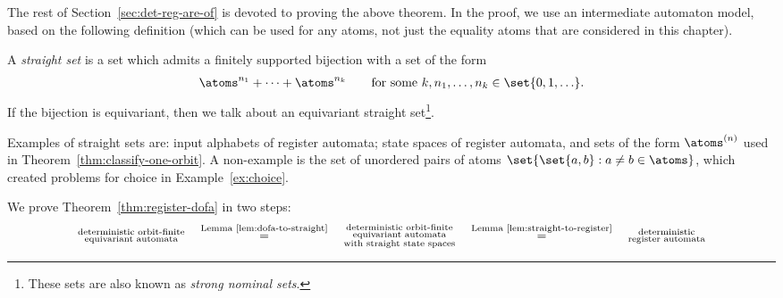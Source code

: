 The rest of Section~\ref{sec:det-reg-are-of} is devoted to proving the above theorem. In the proof, we use an intermediate automaton model, based on the following definition (which can be used for any atoms, not just the equality atoms that are considered in this chapter).

\begin{definition}\label{def:straight-set}
 A \emph{straight set} is a set which admits a finitely supported bijection with a set of the form 
 \begin{align*}
 \atoms^{n_1} + \cdots + \atoms^{n_k} \qquad \text{for some $k, n_1,\ldots,n_k \in \set{0,1,\ldots}$}.
 \end{align*}
 If the bijection is equivariant, then we talk about an equivariant straight set\footnote{These sets are also known as \emph{strong nominal sets}.}.
\end{definition}
Examples of straight sets are: input alphabets of register automata; state spaces of register automata, and sets of the form $\atoms^{(n)}$ used in Theorem~\ref{thm:classify-one-orbit}. A non-example is the set of unordered pairs of atoms $\set{\set{a,b}: a \neq b \in \atoms}$, which created problems for choice in Example~\ref{ex:choice}. 

 We prove Theorem~\ref{thm:register-dofa} in two steps:
\begin{align*}
 {\substack{\text{deterministic orbit-finite}\\\text{equivariant automata}}} \quad \stackrel{\text{Lemma~\ref{lem:dofa-to-straight}}} = \quad {\substack{\text{deterministic orbit-finite}\\\text{equivariant automata} \\\text{with straight state spaces}}} \quad \stackrel{\text{Lemma~\ref{lem:straight-to-register}}} = \quad {\substack{\text{deterministic}\\\text{register automata}}}
\end{align*}


